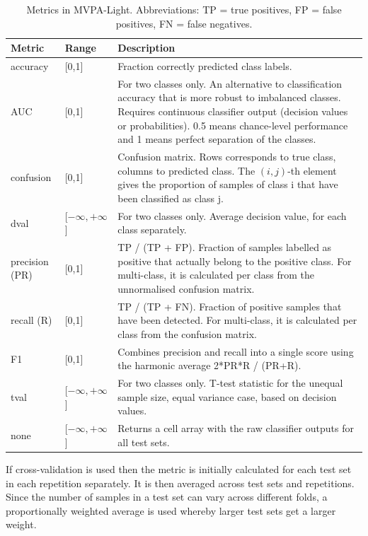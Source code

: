 \documentclass[utf8]{frontiersSCNS} %
\begin{document}
\begin{table}[]
\begin{tabularx}{\textwidth}{llX}
 Metric &  Range & Description   \\\hline
 accuracy  &  [0,1] &  Fraction correctly predicted class labels.\\
 AUC & [0,1] & For two classes only. An alternative to classification accuracy that is more robust to imbalanced classes. Requires continuous classifier output (decision values or probabilities). 0.5 means chance-level performance and 1 means perfect separation of the classes.\\
 confusion & [0,1] &  Confusion matrix. Rows corresponds to true class, columns  to predicted class. The $(i,j)$-th element gives the proportion of samples of class i that have been classified as class j.\\
 dval & [$-\infty,+\infty$] & For two classes only. Average decision value, for each class separately.\\
 precision (PR) & [0,1] & TP / (TP + FP). Fraction of samples labelled as positive that actually belong to the positive class. For multi-class, it is calculated per class from the unnormalised confusion matrix.\\
recall (R) & [0,1] & TP / (TP + FN). Fraction of positive samples that have been detected. For multi-class, it is calculated per class from the confusion matrix.\\
F1 & [0,1] & Combines precision and recall into a single score using the harmonic average 2*PR*R / (PR+R).\\
tval & [$-\infty,+\infty$] & For two classes only. T-test statistic for the unequal sample size, equal variance case, based on decision values.\\
none & [$-\infty,+\infty$] & Returns a cell array with the raw classifier outputs for all test sets.\\\hline
\end{tabularx}
\caption{Metrics in MVPA-Light. Abbreviations: TP = true positives, FP = false positives, FN = false negatives.}
\label{tab:metrics}
\end{table}

If cross-validation is used then the metric is initially calculated for each test set in each repetition separately. It is then averaged across test sets and repetitions. Since the number of samples in a test set can vary across different folds, a proportionally weighted average is used whereby larger test sets get a larger weight.
\end{document}
